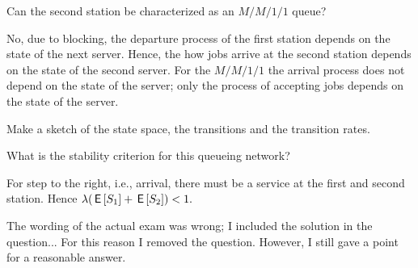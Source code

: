 
\begin{exercise}[201706]
 Can the second station be characterized as an $M/M/1/1$ queue? 
\begin{solution}
 No, due to blocking, the departure process of the first station depends on the state of the next server. Hence, the how jobs arrive at the second station depends on the state of the second server. For the $M/M/1/1$ the arrival process does not depend on the state of the server; only the process of accepting jobs depends on the state of the server. 
\end{solution}
\end{exercise}


\begin{exercise}[201706]
Make a sketch of the state space, the transitions and the transition rates.
\begin{solution}
 \begin{center}
 
 \end{center}
\end{solution}
\end{exercise}

\begin{exercise}[201706]
What is the stability criterion for this queueing network?
\begin{solution}
For step to the right, i.e., arrival, there must be a service at the first and second station. Hence $\lambda (\,\mathsf{E}\left[S_1\right] + \,\mathsf{E}\left[S_2\right] ) < 1.$ 

The wording of the actual exam was wrong; I included the solution in the question... For this reason I removed the question. However, I still gave a point for a reasonable answer. 
\end{solution}
\end{exercise}


